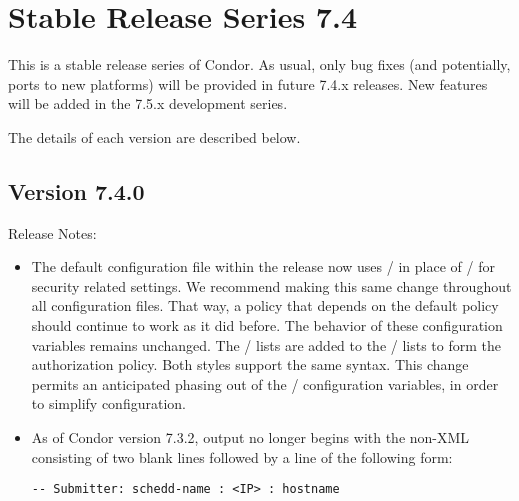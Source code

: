 
\section{\label{sec:History-7-4}Stable Release Series 7.4}

This is a stable release series of Condor.
As usual, only bug fixes (and potentially, ports to new platforms)
will be provided in future 7.4.x releases.
New features will be added in the 7.5.x development series.

The details of each version are described below.

\subsection*{\label{sec:New-7-4-0}Version 7.4.0}

\noindent Release Notes:

\begin{itemize}

\item The default configuration file within the release now uses
  / in place of
  / for security related settings.
  We recommend making this
  same change throughout all configuration files.  That way,
  a policy that depends on the default policy should continue to
  work as it did before.  The behavior of these configuration variables
  remains unchanged.  The / lists are
  added to the / lists to form the
  authorization policy.  Both styles support the same syntax.  
  This change permits an anticipated
  phasing out of the /  configuration
  variables, in order to simplify configuration.

\item As of Condor version 7.3.2,   output no longer 
  begins with the non-XML consisting of two blank lines followed by a line
  of the following form:

\begin{verbatim}
-- Submitter: schedd-name : <IP> : hostname
\end{verbatim}

\end{itemize}


